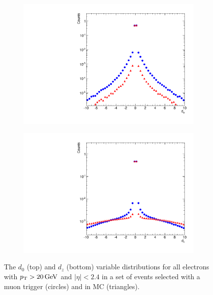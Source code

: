 \begin{figure}[!htbp]
    \centering
    \begin{subfigure}[b]{0.65\textwidth}
        \includegraphics[width=\textwidth]{figures/d0.pdf}
        \caption{}
        \label{fig:d0}
    \end{subfigure}
    \begin{subfigure}[b]{0.65\textwidth}
        \includegraphics[width=\textwidth]{figures/dz.pdf}
        \caption{}
        \label{fig:dz}
    \end{subfigure}
    \caption{
        The $d_{0}$ (top) and $d_{z}$ (bottom) variable distributions for all
        electrons with $p_{\mathrm{T}} > 20 \,\text{Ge\hspace{-.08em}V}$ and $|\eta| < 2.4$ in a set of events
        selected with a muon trigger (circles) and in \MADGRAPH \Ztoee MC
        (triangles).
    }
    \label{fig:d0_dz}
\end{figure}
